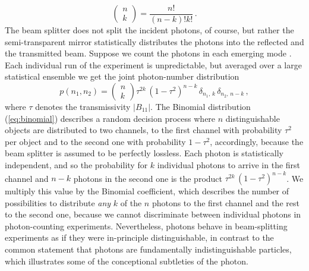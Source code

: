 \documentclass[12pt,amsmath,amssymb]{article}
\numberwithin{equation}{section}
\begin{document}
\begin{equation}
\left(\begin{array}{c}n\\k\end{array}\right) =
\frac{n!}{(n-k)!k!} \,.
\end{equation}
The beam splitter does not
split the incident photons, of course, but rather the
semi-transparent mirror statistically distributes the photons
into the reflected and the transmitted beam. Suppose we count the
photons in each emerging mode \cite{Brendel}. Each individual run
of the experiment \cite{Brendel} is unpredictable, but averaged
over a large statistical ensemble we get the joint photon-number
distribution
\begin{equation}
\label{eq:binomial} p(n_1,n_2) =
\left(\begin{array}{c}n\\k\end{array}\right)
\tau^{2k}\,(1-\tau^2)^{n-k}\,
\delta_{n_1,\,k}\,\delta_{n_2,\,n-k}\,,
\end{equation}
where $\tau$ denotes the transmissivity $|B_{11}|$. The Binomial
distribution (\ref{eq:binomial}) describes a random decision
process where $n$ distinguishable objects are distributed to two
channels, to the first channel with probability $\tau^2$ per
object and to the second one with probability $1-\tau^2$,
accordingly, because the beam splitter is assumed to be perfectly
lossless. Each photon is statistically independent, and so the
probability for $k$ individual photons to arrive in the first
channel and $n-k$ photons in the second one is the product
$\tau^{2k}\,(1-\tau^2)^{n-k}$. We multiply this value by the
Binomial coefficient, which describes the number of possibilities
to distribute {\it any} $k$ of the $n$ photons to the first
channel and the rest to the second one, because we cannot
discriminate between individual photons in
photon-counting experiments.
Nevertheless, photons behave in beam-splitting experiments as if
they were in-principle distinguishable,
in contrast to the common
statement that photons are fundamentally indistinguishable particles,
which illustrates some of the conceptional subtleties
of the photon.
\end{document}
